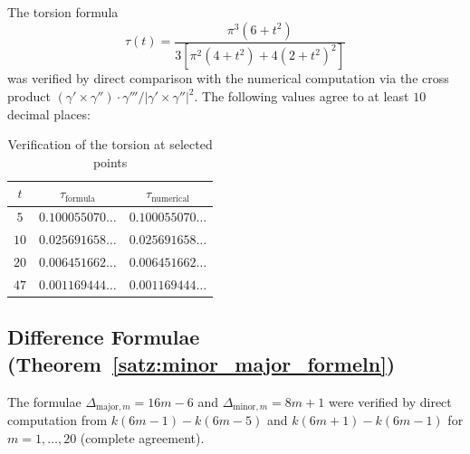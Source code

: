 The torsion formula
\[
\tau(t) = \frac{\pi^3(6+t^2)}{3[\pi^2(4+t^2)+4(2+t^2)^2]}
\]
was verified by direct comparison with the numerical computation via the
cross product $(\gamma' \times \gamma'') \cdot \gamma''' / |\gamma' \times \gamma''|^2$.
The following values agree to at least $10$ decimal places:

\begin{table}[h]
\centering
\caption{Verification of the torsion at selected points}
\begin{tabular}{ccc}
\toprule
$t$ & $\tau_{\text{formula}}$ & $\tau_{\text{numerical}}$ \\
\midrule
$5$  & $0.100055070\ldots$ & $0.100055070\ldots$ \\
$10$ & $0.025691658\ldots$ & $0.025691658\ldots$ \\
$20$ & $0.006451662\ldots$ & $0.006451662\ldots$ \\
$47$ & $0.001169444\ldots$ & $0.001169444\ldots$ \\
\bottomrule
\end{tabular}
\end{table}

\subsection{Difference Formulae (Theorem~\ref{satz:minor_major_formeln})}

The formulae $\Delta_{\mathrm{major},m} = 16m-6$ and $\Delta_{\mathrm{minor},m} = 8m+1$
were verified by direct computation from $k(6m-1)-k(6m-5)$ and $k(6m+1)-k(6m-1)$
for $m = 1, \ldots, 20$ (complete agreement).
